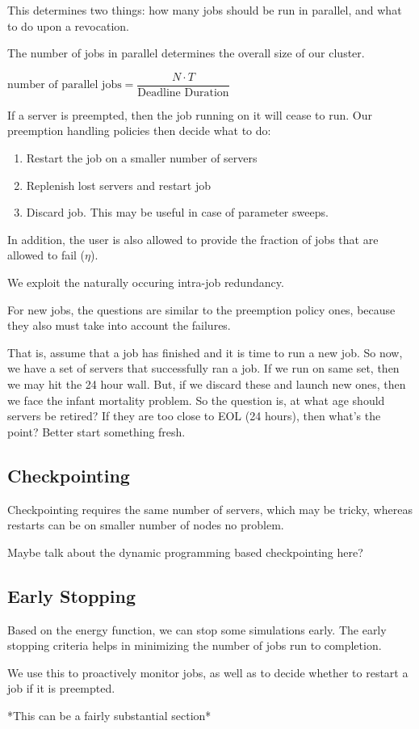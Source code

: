 This determines two things: how many jobs should be run in parallel, and what to do upon a revocation.

The number of jobs in parallel determines the overall size of our cluster.

$\text{number of parallel jobs} = \dfrac{N\cdot T}{\text{Deadline Duration}}$

If a server is preempted, then the job running on it will cease to run.
Our preemption handling policies then decide what to do:
\begin{enumerate}
\item Restart the job on a smaller number of servers 
\item Replenish lost servers and restart job
\item Discard job. This may be useful in case of parameter sweeps. 
\end{enumerate}

In addition, the user is also allowed to provide the fraction of jobs that are allowed to fail ($\eta$).

We exploit the naturally occuring intra-job redundancy. 

For new jobs, the questions are similar to the preemption policy ones, because they also must take into account the failures.

That is, assume that a job has finished and it is time to run a new job. So now, we have a set of servers that successfully ran a job. If we run on same set, then we may hit the 24 hour wall. But, if we discard these and launch new ones, then we face the infant mortality problem. So the question is, at what age should servers be retired? If they are too close to EOL (24 hours), then what's the point? Better start something fresh.



\subsection{Checkpointing}

Checkpointing requires the same number of servers, which may be tricky, whereas restarts can be on smaller number of nodes no problem.

Maybe talk about the dynamic programming based checkpointing here?



\subsection{Early Stopping}

Based on the energy function, we can stop some simulations early.
The early stopping criteria helps in minimizing the number of jobs run to completion.

We use this to proactively monitor jobs, as well as to decide whether to restart a job if it is preempted.

*This can be a fairly substantial section*



